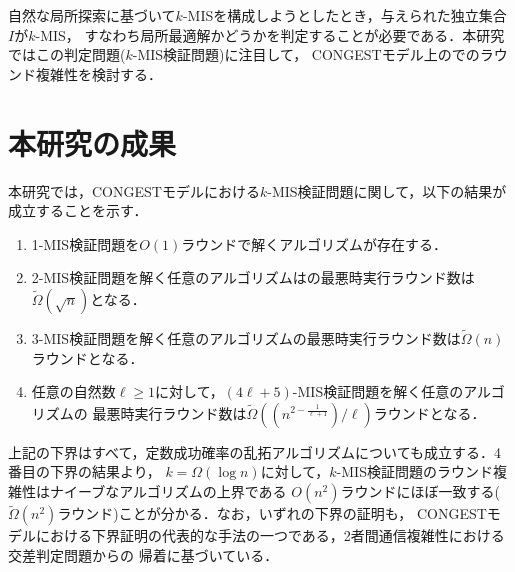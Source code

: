 \documentclass[12pt]{thesis}
\newcommand{\CONGEST}{\textsf{CONGEST}}
\theoremstyle{definition}
\begin{document}
自然な局所探索に基づいて$k$-MISを構成しようとしたとき，与えられた独立集合$I$が$k$-MIS，
すなわち局所最適解かどうかを判定することが必要である．本研究ではこの判定問題($k$-MIS検証問題)に注目して，
{\CONGEST}モデル上のでのラウンド複雑性を検討する．

\section{本研究の成果}
本研究では，{\CONGEST}モデルにおける$k$-MIS検証問題に関して，以下の結果が成立することを示す．
\begin{enumerate}
\item 1-MIS検証問題を$O(1)$ラウンドで解くアルゴリズムが存在する．
\item 2-MIS検証問題を解く任意のアルゴリズムはの最悪時実行ラウンド数は$\tilde{\Omega} (\sqrt{n})$となる．
\item 3-MIS検証問題を解く任意のアルゴリズムの最悪時実行ラウンド数は$\tilde{\Omega}(n)$ラウンドとなる．
\item 任意の自然数$\ell \geq 1$に対して，$(4\ell + 5)$-MIS検証問題を解く任意のアルゴリズムの
最悪時実行ラウンド数は$\tilde{\Omega}\left((n^{2 - \frac{1}{\ell+1}})/\ell\right)$ラウンドとなる．
\end{enumerate}

上記の下界はすべて，定数成功確率の乱拓アルゴリズムについても成立する．4番目の下界の結果より，
$k=\Omega(\log n)$に対して，$k$-MIS検証問題のラウンド複雑性はナイーブなアルゴリズムの上界である
$O(n^2)$ラウンドにほぼ一致する($\tilde{\Omega}(n^2)$ラウンド)ことが分かる．なお，いずれの下界の証明も，
{\CONGEST}モデルにおける下界証明の代表的な手法の一つである，2者間通信複雑性における交差判定問題からの
帰着に基づいている．
\end{document}
